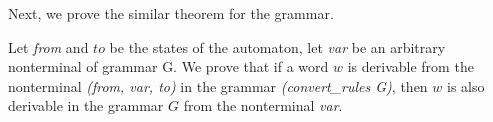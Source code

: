 %
%


Next, we prove the similar theorem for the grammar.

\begin{theorem}
	Let \textit{from} and $to$ be the states of the automaton, let \textit{var} be an arbitrary nonterminal of grammar G. We prove that if a word $w$ is derivable from the nonterminal \textit{(from, var, to)} in the grammar \textit{(convert\_rules G)}, then $w$ is also derivable in the grammar $G$ from the nonterminal \textit{var}.
\end{theorem}

